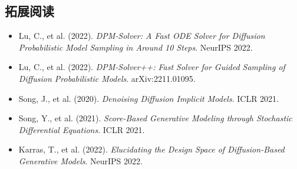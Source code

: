 \subsection{拓展阅读}

\begin{itemize}
    \item Lu, C., et al. (2022). \textit{DPM-Solver: A Fast ODE Solver for Diffusion Probabilistic Model Sampling in Around 10 Steps}. NeurIPS 2022.
    \item Lu, C., et al. (2022). \textit{DPM-Solver++: Fast Solver for Guided Sampling of Diffusion Probabilistic Models}. arXiv:2211.01095.
    \item Song, J., et al. (2020). \textit{Denoising Diffusion Implicit Models}. ICLR 2021.
    \item Song, Y., et al. (2021). \textit{Score-Based Generative Modeling through Stochastic Differential Equations}. ICLR 2021.
    \item Karras, T., et al. (2022). \textit{Elucidating the Design Space of Diffusion-Based Generative Models}. NeurIPS 2022.
\end{itemize}



